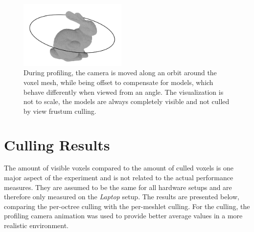 \begin{figure}[h]
    \centering
    \includegraphics[width=200px]{images/graphics/test-anim-camera-path.jpg}
    \caption{During profiling, the camera is moved along an orbit around the voxel mesh, while being offset to compensate 
    for models, which behave differently when viewed from an angle. The visualization is not to scale, the models 
    are always completely visible and not culled by view frustum culling.}
    \label{fig:test-anim-camera-path}
\end{figure}



%
%
%
%
%
%


\section{Culling Results}

The amount of visible voxels compared to the amount of culled voxels is one major aspect of the 
experiment and is not related to the actual performance measures. They are assumed to be the same 
for all hardware setups and are therefore only measured on the \emph{Laptop} setup. The results are 
presented below, comparing the per-octree culling with the per-meshlet culling. For the culling, the 
profiling camera animation was used to provide better average values in a more realistic environment.\\


